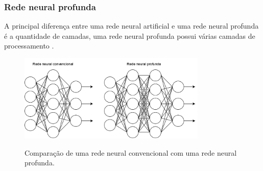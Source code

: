 \subsubsection*{Rede neural profunda}

A principal diferença entre uma rede neural artificial e uma rede neural profunda é a quantidade de camadas, uma rede neural profunda possui várias camadas de processamento .

\begin{figure}[H]
	\centering
	\caption{Comparação de uma rede neural convencional com uma rede neural profunda.}
	\includegraphics[width=0.8\textwidth]{figures/redes_neurais.png}
	\label{fig:redes_neurais}
\end{figure}